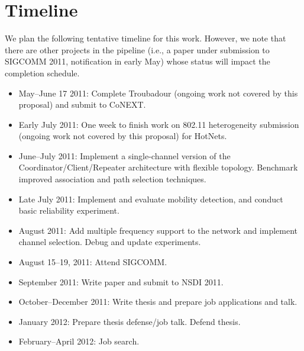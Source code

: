 \section{Timeline}
\label{sec:timeline}
We plan the following tentative timeline for this work. However, we note that there are other projects in the pipeline (i.e., a paper under submission to SIGCOMM 2011, notification in early May) whose status will impact the completion schedule.
\begin{itemize}[leftmargin=1em,itemsep=0pt,topsep=3pt,labelsep=0.5em]
\item May--June 17 2011: Complete Troubadour (ongoing work not covered by this proposal) and submit to CoNEXT.
\item Early July 2011: One week to finish work on 802.11 heterogeneity submission (ongoing work not covered by this proposal) for HotNets.
\item June--July 2011: Implement a single-channel version of the Coordinator/Client/Repeater architecture with flexible topology. Benchmark improved  association and path selection techniques.
\item Late July 2011: Implement and evaluate mobility detection, and conduct basic reliability experiment.
\item August 2011: Add multiple frequency support to the network and implement channel selection. Debug and update experiments.
\item August 15--19, 2011: Attend SIGCOMM.
\item September 2011: Write paper and submit to NSDI 2011.
\item October--December 2011: Write thesis and prepare job applications and talk.
\item January 2012: Prepare thesis defense/job talk. Defend thesis.
\item February--April 2012: Job search.
\end{itemize}